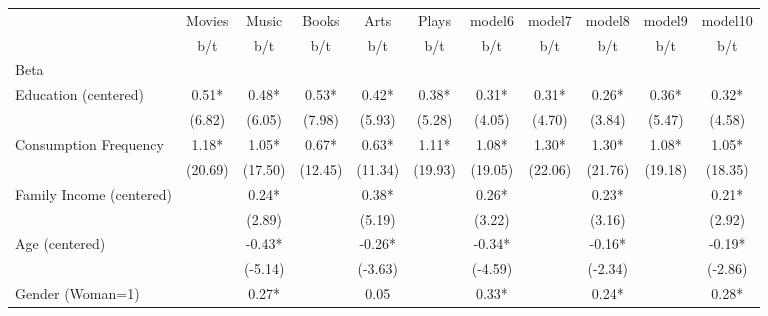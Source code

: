 {
\def\sym#1{\ifmmode^{#1}\else\(^{#1}\)\fi}
\begin{tabular*}{\hsize}{@{\hskip\tabcolsep\extracolsep\fill}l*{10}{c}}
\toprule
                    &\multicolumn{1}{c}{Movies}&\multicolumn{1}{c}{Music}&\multicolumn{1}{c}{Books}&\multicolumn{1}{c}{Arts}&\multicolumn{1}{c}{Plays}&\multicolumn{1}{c}{model6}&\multicolumn{1}{c}{model7}&\multicolumn{1}{c}{model8}&\multicolumn{1}{c}{model9}&\multicolumn{1}{c}{model10}\\
                    &         b/t &         b/t &         b/t &         b/t &         b/t &         b/t &         b/t &         b/t &         b/t &         b/t \\
\midrule
Beta                &             &             &             &             &             &             &             &             &             &             \\
Education (centered)&        0.51*&        0.48*&        0.53*&        0.42*&        0.38*&        0.31*&        0.31*&        0.26*&        0.36*&        0.32*\\
                    &      (6.82) &      (6.05) &      (7.98) &      (5.93) &      (5.28) &      (4.05) &      (4.70) &      (3.84) &      (5.47) &      (4.58) \\
Consumption Frequency&        1.18*&        1.05*&        0.67*&        0.63*&        1.11*&        1.08*&        1.30*&        1.30*&        1.08*&        1.05*\\
                    &     (20.69) &     (17.50) &     (12.45) &     (11.34) &     (19.93) &     (19.05) &     (22.06) &     (21.76) &     (19.18) &     (18.35) \\
Family Income (centered)&             &        0.24*&             &        0.38*&             &        0.26*&             &        0.23*&             &        0.21*\\
                    &             &      (2.89) &             &      (5.19) &             &      (3.22) &             &      (3.16) &             &      (2.92) \\
Age (centered)      &             &       -0.43*&             &       -0.26*&             &       -0.34*&             &       -0.16*&             &       -0.19*\\
                    &             &     (-5.14) &             &     (-3.63) &             &     (-4.59) &             &     (-2.34) &             &     (-2.86) \\
Gender (Woman=1)    &             &        0.27*&             &        0.05 &             &        0.33*&             &        0.24*&             &        0.28*\\

\end{tabular*}}
